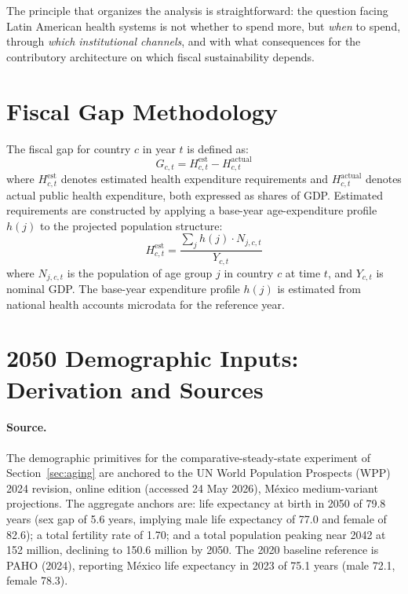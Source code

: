 \documentclass[12pt,a4paper]{article}
\begin{document}
The principle that organizes the analysis is straightforward: the question facing Latin American health systems is not whether to spend more, but \textit{when} to spend, through \textit{which institutional channels}, and with what consequences for the contributory architecture on which fiscal sustainability depends.


\begin{appendices}

\section{Fiscal Gap Methodology}
\label{app:fiscal_gap}

The fiscal gap for country $c$ in year $t$ is defined as:
\begin{equation}
\label{eq:fiscal_gap}
G_{c,t} = H_{c,t}^{\text{est}} - H_{c,t}^{\text{actual}}
\end{equation}
where $H_{c,t}^{\text{est}}$ denotes estimated health expenditure requirements and $H_{c,t}^{\text{actual}}$ denotes actual public health expenditure, both expressed as shares of GDP. Estimated requirements are constructed by applying a base-year age-expenditure profile $h(j)$ to the projected population structure:
\begin{equation}
\label{eq:fiscal_gap_est}
H_{c,t}^{\text{est}} = \frac{\sum_j h(j) \cdot N_{j,c,t}}{Y_{c,t}}
\end{equation}
where $N_{j,c,t}$ is the population of age group $j$ in country $c$ at time $t$, and $Y_{c,t}$ is nominal GDP. The base-year expenditure profile $h(j)$ is estimated from national health accounts microdata for the reference year.


\section{2050 Demographic Inputs: Derivation and Sources}
\label{app:demog2050}

\paragraph{Source.} The demographic primitives for the comparative-steady-state experiment of Section~\ref{sec:aging} are anchored to the UN World Population Prospects (WPP) 2024 revision, online edition (accessed 24 May 2026), M\'exico medium-variant projections. The aggregate anchors are: life expectancy at birth in 2050 of 79.8 years (sex gap of 5.6 years, implying male life expectancy of 77.0 and female of 82.6); a total fertility rate of 1.70; and a total population peaking near 2042 at 152 million, declining to 150.6 million by 2050. The 2020 baseline reference is PAHO (2024), reporting M\'exico life expectancy in 2023 of 75.1 years (male 72.1, female 78.3).


\end{appendices}
\end{document}
